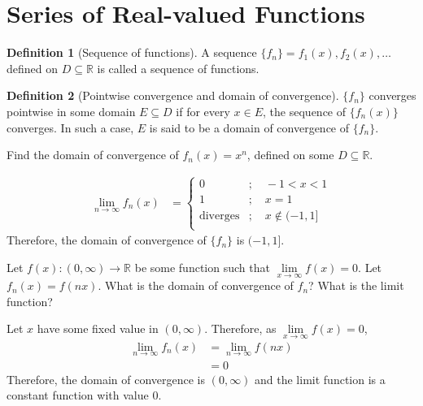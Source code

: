\documentclass[fleqn, a4paper, 12pt, twoside]{article}
\theoremstyle{definition}
\newtheorem{definition}{Definition}
\theoremstyle{theorem}
\begin{document}
{\section{Series of Real-valued Functions}

\begin{definition}[Sequence of functions]
	A sequence $\{f_n\} = f_1(x), f_2(x), \dots$ defined on $D \subseteq \mathbb{R}$ is called a sequence of functions.
\end{definition}

\begin{definition}[Pointwise convergence and domain of convergence]
	$\{f_n\}$ converges pointwise in some domain $E \subseteq D$ if for every $x \in E$, the sequence of $\{f_n(x)\}$ converges.
	In such a case, $E$ is said to be a domain of convergence of $\{f_n\}$.
\end{definition}

\begin{question}
	Find the domain of convergence of $f_n(x) = x^n$, defined on some $D \subseteq \mathbb{R}$.
\end{question}

\begin{solution}
	\begin{align*}
		\lim\limits_{n \to \infty} f_n(x) &= 
			\begin{cases}
				0               & ;\quad -1 < x < 1      \\
				1               & ;\quad x = 1           \\
				\text{diverges} & ;\quad x \notin (-1,1] \\
			\end{cases}
	\end{align*}
	Therefore, the domain of convergence of $\{f_n\}$ is $(-1,1]$.
\end{solution}

\begin{question}
	Let $f(x) : (0,\infty) \to \mathbb{R}$ be some function such that $\lim\limits_{x \to \infty} f(x) = 0$.
	Let $f_n(x) = f(n x)$.
	What is the domain of convergence of $f_n$?
	What is the limit function?
\end{question}

\begin{solution}
	Let $x$ have some fixed value in $(0,\infty)$.
	Therefore, as $\lim\limits_{x \to \infty} f(x) = 0$,
	\begin{align*}
		\lim\limits_{n \to \infty} f_n(x) & = \lim\limits_{n \to \infty} f(n x) \\
                                                  & = 0
	\end{align*}
	Therefore, the domain of convergence is $(0,\infty)$ and the limit function is a constant function with value $0$.
\end{solution}

}
\end{document}
